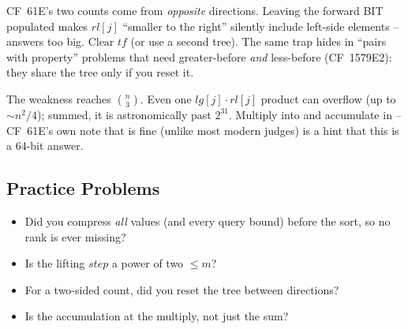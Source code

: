 \begin{warningbox}
CF~61E's two counts come from \emph{opposite} directions.  Leaving the
forward BIT populated makes \(\mathit{rl}[j]\) ``smaller to the right''
silently include left-side elements -- answers too big.  Clear \(\mathit{tf}\)
(or use a second tree).  The same trap hides in ``pairs with property''
problems that need greater-before \emph{and} less-before
(CF~1579E2): they share the tree only if you reset it.
\end{warningbox}

\begin{warningbox}
The weakness reaches \(\binom{n}{3}\).  Even one \(\mathit{lg}[j]\cdot
\mathit{rl}[j]\) product can overflow  (up to \(\sim n^2/4\));
summed, it is astronomically past \(2^{31}\).  Multiply into 
and accumulate in  -- CF~61E's own note that 
is fine (unlike most modern judges) is a hint that this is a 64-bit answer.
\end{warningbox}

\subsection{Practice Problems}

\begin{stuckbox}
\begin{itemize}[nosep,leftmargin=1.4em]
  \item Did you compress \emph{all} values (and every query bound) before the
        sort, so no rank is ever missing?
  \item Is the lifting \(\mathit{step}\) a power of two \(\le m\)?
  \item For a two-sided count, did you reset the tree between directions?
  \item Is the accumulation  at the multiply, not just the sum?
\end{itemize}
\end{stuckbox}

